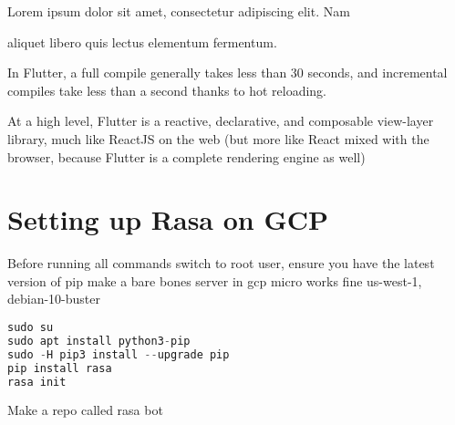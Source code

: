 \begin{noteblock}
Lorem ipsum dolor sit amet, consectetur adipiscing elit. Nam

aliquet libero quis lectus elementum fermentum.
\end{noteblock}

In Flutter, a full compile
generally takes less than 30 seconds, and incremental compiles take less than a second
thanks to hot reloading. 

At a high level, Flutter is a reactive, declarative, and composable view-layer library,
much like ReactJS on the web (but more like React mixed with the browser, because
Flutter is a complete rendering engine as well)


\section{Setting up Rasa on GCP}

Before running all commands switch to root user, ensure you have the latest version of pip
make a bare bones server in gcp micro works fine us-west-1, debian-10-buster

\begin{lstlisting}[language=C++, caption={Bash Script}]
sudo su
sudo apt install python3-pip
sudo -H pip3 install --upgrade pip
pip install rasa
rasa init
\end{lstlisting}

Make a repo called rasa bot

